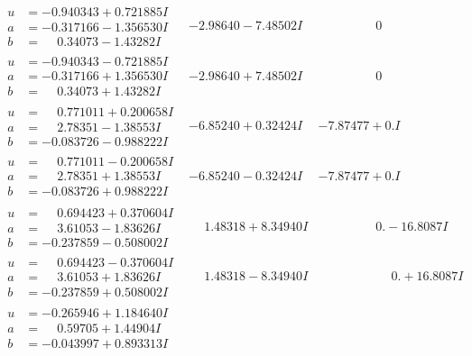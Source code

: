 \documentclass[1p]{elsarticle_modified}
\theoremstyle{definition}
\begin{document}
$$\begin{array}{c|c|c}
\begin{aligned}
u &= -0.940343 + 0.721885 I \\
a &= -0.317166 - 1.356530 I \\
b &= \phantom{-}0.34073 - 1.43282 I\end{aligned}
 & -2.98640 - 7.48502 I & \phantom{-0.000000 } 0 \\ \hline\begin{aligned}
u &= -0.940343 - 0.721885 I \\
a &= -0.317166 + 1.356530 I \\
b &= \phantom{-}0.34073 + 1.43282 I\end{aligned}
 & -2.98640 + 7.48502 I & \phantom{-0.000000 } 0 \\ \hline\begin{aligned}
u &= \phantom{-}0.771011 + 0.200658 I \\
a &= \phantom{-}2.78351 - 1.38553 I \\
b &= -0.083726 - 0.988222 I\end{aligned}
 & -6.85240 + 0.32424 I & -7.87477 + 0. I\phantom{ +0.000000I} \\ \hline\begin{aligned}
u &= \phantom{-}0.771011 - 0.200658 I \\
a &= \phantom{-}2.78351 + 1.38553 I \\
b &= -0.083726 + 0.988222 I\end{aligned}
 & -6.85240 - 0.32424 I & -7.87477 + 0. I\phantom{ +0.000000I} \\ \hline\begin{aligned}
u &= \phantom{-}0.694423 + 0.370604 I \\
a &= \phantom{-}3.61053 - 1.83626 I \\
b &= -0.237859 - 0.508002 I\end{aligned}
 & \phantom{-}1.48318 + 8.34940 I & \phantom{-0.000000 } 0. - 16.8087 I \\ \hline\begin{aligned}
u &= \phantom{-}0.694423 - 0.370604 I \\
a &= \phantom{-}3.61053 + 1.83626 I \\
b &= -0.237859 + 0.508002 I\end{aligned}
 & \phantom{-}1.48318 - 8.34940 I & \phantom{-0.000000 -}0. + 16.8087 I \\ \hline\begin{aligned}
u &= -0.265946 + 1.184640 I \\
a &= \phantom{-}0.59705 + 1.44904 I \\
b &= -0.043997 + 0.893313 I\end{aligned}

\end{array}$$
\end{document}
